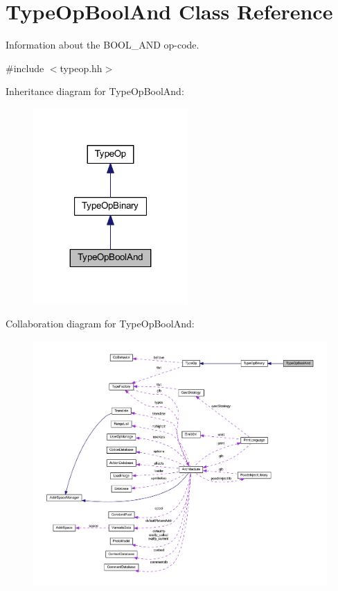 \hypertarget{class_type_op_bool_and}{}\section{Type\+Op\+Bool\+And Class Reference}
\label{class_type_op_bool_and}


Information about the B\+O\+O\+L\+\_\+\+A\+ND op-\/code.  




{\ttfamily \#include $<$typeop.\+hh$>$}



Inheritance diagram for Type\+Op\+Bool\+And\+:
\nopagebreak
\begin{figure}[H]
\begin{center}
\leavevmode
\includegraphics[width=167pt]{class_type_op_bool_and__inherit__graph}
\end{center}
\end{figure}


Collaboration diagram for Type\+Op\+Bool\+And\+:
\nopagebreak
\begin{figure}[H]
\begin{center}
\leavevmode
\includegraphics[width=350pt]{class_type_op_bool_and__coll__graph}
\end{center}
\end{figure}
